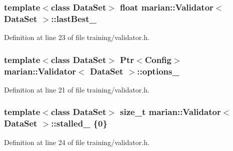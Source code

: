 \subsubsection[{\texorpdfstring{last\+Best\+\_\+}{lastBest_}}]{\setlength{\rightskip}{0pt plus 5cm}template$<$class Data\+Set$>$ float {\bf marian\+::\+Validator}$<$ Data\+Set $>$\+::last\+Best\+\_\+\hspace{0.3cm}{\ttfamily [protected]}}\hypertarget{classmarian_1_1Validator_a6fbe055b2a8c2341172091b2bbde0a59}{}\label{classmarian_1_1Validator_a6fbe055b2a8c2341172091b2bbde0a59}


Definition at line 23 of file training/validator.\+h.

\subsubsection[{\texorpdfstring{options\+\_\+}{options_}}]{\setlength{\rightskip}{0pt plus 5cm}template$<$class Data\+Set$>$ {\bf Ptr}$<${\bf Config}$>$ {\bf marian\+::\+Validator}$<$ Data\+Set $>$\+::options\+\_\+\hspace{0.3cm}{\ttfamily [protected]}}\hypertarget{classmarian_1_1Validator_a59fc30678618608874029374e386d3c0}{}\label{classmarian_1_1Validator_a59fc30678618608874029374e386d3c0}


Definition at line 21 of file training/validator.\+h.

\subsubsection[{\texorpdfstring{stalled\+\_\+}{stalled_}}]{\setlength{\rightskip}{0pt plus 5cm}template$<$class Data\+Set$>$ size\+\_\+t {\bf marian\+::\+Validator}$<$ Data\+Set $>$\+::stalled\+\_\+ \{0\}\hspace{0.3cm}{\ttfamily [protected]}}\hypertarget{classmarian_1_1Validator_a9fe2c3f4b9b5f38d1a2db2a9ba8704e8}{}\label{classmarian_1_1Validator_a9fe2c3f4b9b5f38d1a2db2a9ba8704e8}


Definition at line 24 of file training/validator.\+h.


